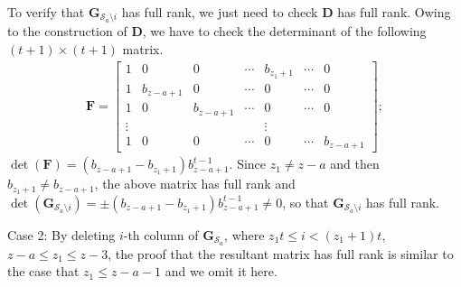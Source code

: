 \documentclass[journal,twocolumn]{IEEEtran}
\theoremstyle{definition}
\newcommand{\calS}{\mathcal{S}}
\newcommand{\bfG}{\mathbf{G}}
\newcommand{\bfD}{\mathbf{D}}
\newcommand{\bfF}{\mathbf{F}}
\newcommand{\aditya}[1]{\marginpar{+}{\bf Aditya's remark}: {\em #1}}
\begin{document}
\begin{itemize}
	To verify that $\bfG_{\calS_a \setminus i}$ has full rank, we just need to check $\bfD$ has full rank. Owing to the construction of $\bfD$, we have to check the determinant of the following $(t+1) \times (t+1)$ matrix.
	\begin{align*}
	\bfF=
		\begin{bmatrix}
			1&0 & 0 & \cdots & b_{z_1+1}& \cdots &0\\
			1&b_{z-a+1} &0 &\cdots & 0 & \cdots &0\\
			1&0 & b_{z-a+1}&\cdots & 0 & \cdots &0\\
			\vdots&&&&\vdots\\
			1&0&0&\cdots & 0 & \cdots&b_{z-a+1}
		\end{bmatrix};
	\end{align*}
	$\det(\bfF)=(b_{z-a+1}-b_{z_1+1})b_{z-a+1}^{t-1}$. Since $z_1\neq z-a$ and then $b_{z_1+1}\neq b_{z-a+1}$, the above matrix has full rank and $\det(\bfG_{\calS_a \setminus i})= \pm (b_{z-a+1}-b_{z_1+1})b_{z-a+1}^{t-1}\neq 0$, so that $\bfG_{\calS_a \setminus i}$ has full rank.
	
	Case 2: By deleting $i$-th column of $\bfG_{\calS_a}$, where $z_1t\le i< (z_1+1)t$, $z-a\le z_1\le z-3$, the proof that the resultant matrix has full rank is similar to the case that $z_1\le z-a-1$ and we omit it here. %
	

\end{itemize}
\end{document}
